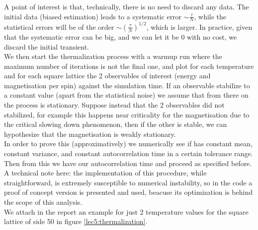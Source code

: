 A point of interest is that, technically, there is no need to discard any data. The initial data (biased estimation) leads to a systematic error $\sim \frac{\tau}{N}$,
while the statistical errors will be of the order $\sim (\frac{\tau}{N})^{1/2}$, which is larger. In practice, given that the systematic error can be big, 
and we can let it be 0 with no cost, we discard the initial transient. \\ 

We then start the thermalization process with a warmup run where the maximum number of iterations is not the final one, and plot for each temperature and for 
each square lattice the 2 observables of interest (energy and magnetisation per spin) against the simulation time. If an observable stabilize to a constant value (apart from the statistical noise) 
we assume that from there on the process is stationary. 
Suppose instead that the 2 observables did not stabilized, for example this happens near criticality for the magnetisation due to the critical slowing down 
phenomenon, then if the other is stable, we can hypothesize that the magnetisation is weakly stationary. \\
In order to prove this (approximatively) we numerically see if has constant mean, constant variance, and constant autocorrelation time in a certain tolerance 
range. Then from this we have our autocorrelation time and proceed as specified before. \\
A technical note here: the implementation of this procedure, while straightforward, is extremely susceptible to numerical instability, 
so in the code a proof of concept version is presented and used, beacuse its optimization is behind the scope of this analysis. \\
We attach in the report an example for just 2 temperature values for the square lattice of side 50 in figure \ref{lec5:thermalization}.


